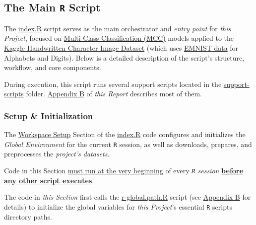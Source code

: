 \documentclass[
]{report}
\begin{document}
\subsection{\texorpdfstring{The Main \texttt{R} Script}{The Main R Script}}\label{the-main-r-script}

The \href{https://github.com/AzKurban-edX-DS/edx.capstone.choose-your-own/blob/main/r/index.R}{index.R} script serves as the main orchestrator and \emph{entry point} for \emph{this Project}, focused on \href{https://en.wikipedia.org/wiki/Multiclass_classification}{Multi-Class Classification (MCC)} models applied to the \href{https://www.kaggle.com/datasets/vaibhao/handwritten-characters}{Kaggle Handwritten Character Image Dataset} (which uses \href{https://www.tensorflow.org/datasets/catalog/emnist}{EMNIST data} for Alphabets and Digits).
Below is a detailed description of the script's structure, workflow, and core components.

\begin{noteblock}
During execution, this script runs several support scripts located in the \href{https://github.com/AzKurban-edX-DS/edx.capstone.choose-your-own/tree/main/r/support-scripts}{support-scripts} folder.
\hyperref[appndx_b]{Appendix B} of \emph{this Report} describes most of them.

\end{noteblock}

\subsubsection{Setup \& Initialization}\label{setup-initialization}

The \href{https://github.com/AzKurban-edX-DS/edx.capstone.choose-your-own/blob/main/r/index.R\#L5-L160}{Workspace Setup} Section of the \href{https://github.com/AzKurban-edX-DS/edx.capstone.choose-your-own/blob/main/r/index.R}{index.R} code configures and initializes the \emph{Global Environment} for the current \texttt{R} session, as well as downloads, prepares, and preprocesses the \emph{project's datasets}.

\begin{importantblock}
Code in this Section \underline{must run at the very beginning} of every \emph{\texttt{R} session} \textbf{\underline{before any other script executes}}.

\end{importantblock}

The code in \emph{this Section} first calls the \href{https://github.com/AzKurban-edX-DS/edx.capstone.choose-your-own/blob/main/r-global.path.R}{r-global.path.R} script (see \hyperref[appndx_b.r_global.path]{Appendix B} for details) to initialize the global variables for \emph{this Project}'s essential \texttt{R} scripts directory paths.
\end{document}
